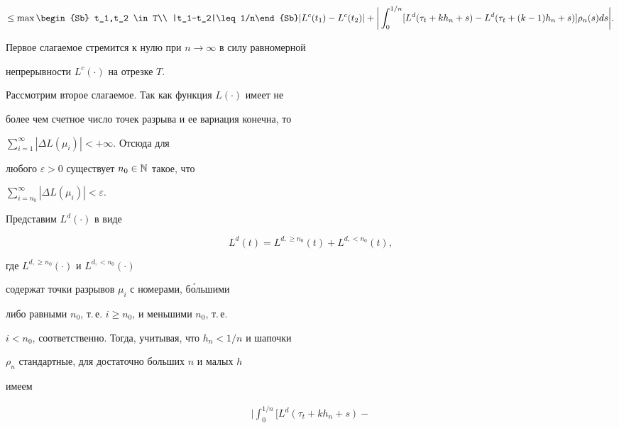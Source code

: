 \begin{pf}
\begin{gather*}
\le \max\begin{Sb} t_1,t_2 \in T\\ |t_1-t_2|\leq 1/n\end{Sb}


|L^c(t_1)-L^c(t_2)|+


\bigg|\int_0^{1/n} [L^d(\tau_t+kh_n+s)-


L^d(\tau_t+(k-1)h_n+s)]\rho_n(s)ds\bigg|.


\end{gather*}





Первое слагаемое стремится к нулю при $n\to\infty$ в силу равномерной


непрерывности $L^c(\cdot)$ на отрезке $ T$.





Рассмотрим второе слагаемое. Так как функция $L(\cdot)$ имеет не


более чем счетное число точек разрыва и ее вариация  конечна, то


$\sum\limits_{i=1}^{\infty}|\Delta L(\mu_i)|<+\infty$. Отсюда для


любого $\varepsilon>0$ существует $n_0\in \Bbb{N}$ такое, что


$\sum\limits_{i=n_0}^{\infty}|\Delta L(\mu_i)|<\varepsilon.$





Представим $L^d(\cdot)$ в виде


\begin{equation}


L^d(t)= L^{d,\geq n_0}(t)+L^{d,<n_0}(t),


\end{equation}


где $L^{d,\geq n_0}(\cdot)$ и $L^{d,<n_0}(\cdot)$


содержат точки разрывов $\mu_i$ с номерами, б\'ольшими


либо равными $n_0$, т.\,е. $i \geq n_0$, и меньшими $n_0$, т.\,е.


$i< n_0$, соответственно. Тогда, учитывая, что $h_n<1/n$ и шапочки


$\rho_n$ стандартные, для достаточно больших $n$  и малых $h$


имеем


\begin{gather*}


\bigg|\int_0^{1/n} [L^d(\tau_t+kh_n+s)-



\end{gather*}
\end{pf}
